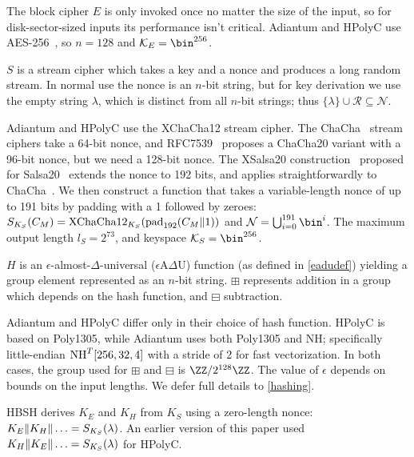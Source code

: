 \documentclass[eprint.tex]{subfiles}
\begin{document}
The block cipher $E$
is only invoked once no matter the size of the input, so for disk-sector-sized inputs
its performance isn't critical. Adiantum and HPolyC use AES-256~\cite{AES}, so $n = 128$ and $\mathcal{K}_E = \bin^{256}$.

$S$
is a stream cipher which takes a key and a nonce and produces a long random stream. In normal use
the nonce is an $n$-bit string, but for key derivation we use the empty string $\lambda$, which
is distinct from all $n$-bit strings; thus $\{\lambda \} \cup \mathcal{R} \subseteq \mathcal{N}$.

Adiantum and HPolyC use the XChaCha12 stream cipher.
The ChaCha~\cite{chacha}
stream ciphers take a 64-bit nonce, and RFC7539~\cite{RFC7539} proposes
a ChaCha20 variant with a 96-bit nonce, but we need a 128-bit nonce.
The XSalsa20 construction~\cite{xsalsa}
proposed for Salsa20~\cite{salsa20,salsa812} extends the nonce to 192 bits, and
applies straightforwardly to ChaCha~\cite{xchacha,monocypher,libsodiumxchacha}.
We then construct a function that takes a variable-length nonce of up to
191 bits by padding with a 1 followed by zeroes:
$S_{K_S}(C_M) = \XChaCha12_{K_S}(\pad_{192}(C_M \Concat 1))$ and
$\mathcal{N} = \bigcup_{i=0}^{191}\bin^i$.
The maximum output length $l_S = 2^{73}$,
and keyspace $\mathcal{K}_S = \bin^{256}$.

$H$
is an $\epsilon$-almost-$\Delta$-universal ($\epsilon$A$\Delta$U) function
(as defined in \autoref{eadudef})
yielding a group element represented as an $n$-bit string.
$\boxplus$ represents addition in a group which depends
on the hash function, and $\boxminus$ subtraction.

\begin{sloppypar}
    Adiantum and HPolyC differ only in their choice of hash function. HPolyC is
    based on Poly1305, while Adiantum uses both Poly1305 and NH;
    specifically little-endian $\operatorname{NH}^T[256, 32, 4]$ with a stride of 2 for fast
    vectorization. In both cases, the group used for $\boxplus$ and $\boxminus$ is
    $\ZZ/2^{128}\ZZ$. The value of $\epsilon$ depends on bounds on the input
    lengths.
    We defer full details to \autoref{hashing}.
\end{sloppypar}

HBSH derives $K_E$ and $K_H$ from $K_S$ using a zero-length nonce:
$K_E \Vert K_H \Vert \ldots = S_{K_S}(\lambda)$. An earlier version of this paper
used $K_H \Vert K_E \Vert \ldots = S_{K_S}(\lambda)$ for HPolyC.

\subbib
\end{document}
